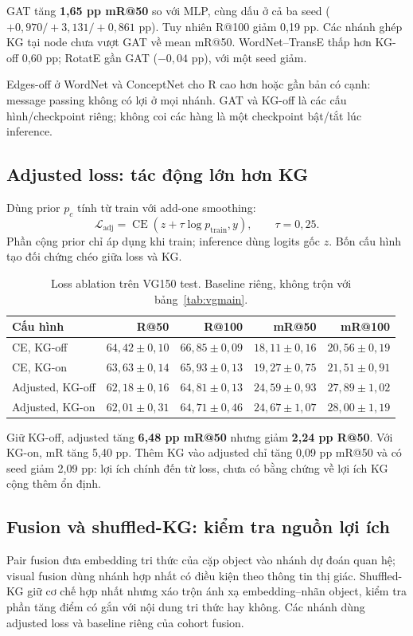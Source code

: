 GAT tăng \textbf{1,65 pp mR@50} so với MLP, cùng dấu ở cả ba seed
($+0,970/+3,131/+0,861$ pp). Tuy nhiên R@100 giảm 0,19 pp.
Các nhánh ghép KG tại node chưa vượt GAT về mean mR@50.
WordNet--TransE thấp hơn KG-off 0,60 pp; RotatE gần GAT ($-0,04$ pp),
với một seed giảm.

Edges-off ở WordNet và ConceptNet cho R cao hơn hoặc gần bản có cạnh:
message passing không có lợi ở mọi nhánh. GAT và KG-off là các cấu hình/checkpoint
riêng; không coi các hàng là một checkpoint bật/tắt lúc inference.

\subsection{Adjusted loss: tác động lớn hơn KG}
Dùng prior $p_c$ tính từ train với add-one smoothing:
\[
\mathcal L_{\mathrm{adj}}
=\operatorname{CE}\!\left(z+\tau\log p_{\mathrm{train}},y\right),
\qquad \tau=0,25.
\]
Phần cộng prior chỉ áp dụng khi train; inference dùng logits gốc $z$.
Bốn cấu hình tạo đối chứng chéo giữa loss và KG.

\begin{table}[!t]\centering\small
\caption{Loss ablation trên VG150 test. Baseline riêng, không trộn với bảng~\ref{tab:vgmain}.}\label{tab:loss}
\begin{tabular}{@{}lrrrr@{}}\toprule
Cấu hình & R@50 & R@100 & mR@50 & mR@100\\\midrule
CE, KG-off & $64,42\pm0,10$ & $66,85\pm0,09$ & $18,11\pm0,16$ & $20,56\pm0,19$\\
CE, KG-on & $63,63\pm0,14$ & $65,93\pm0,13$ & $19,27\pm0,75$ & $21,51\pm0,91$\\
Adjusted, KG-off & $62,18\pm0,16$ & $64,81\pm0,13$ & $24,59\pm0,93$ & $27,89\pm1,02$\\
Adjusted, KG-on & $62,01\pm0,31$ & $64,71\pm0,46$ & $24,67\pm1,07$ & $28,00\pm1,19$\\
\bottomrule\end{tabular}\end{table}

Giữ KG-off, adjusted tăng \textbf{6,48 pp mR@50} nhưng giảm
\textbf{2,24 pp R@50}. Với KG-on, mR tăng 5,40 pp.
Thêm KG vào adjusted chỉ tăng 0,09 pp mR@50 và có seed giảm 2,09 pp:
lợi ích chính đến từ loss, chưa có bằng chứng về lợi ích KG cộng thêm ổn định.


\subsection{Fusion và shuffled-KG: kiểm tra nguồn lợi ích}
Pair fusion đưa embedding tri thức của cặp object vào nhánh dự đoán quan hệ;
visual fusion dùng nhánh hợp nhất có điều kiện theo thông tin thị giác.
Shuffled-KG giữ cơ chế hợp nhất nhưng xáo trộn ánh xạ embedding--nhãn object,
kiểm tra phần tăng điểm có gắn với nội dung tri thức hay không.
Các nhánh dùng adjusted loss và baseline riêng của cohort fusion.

